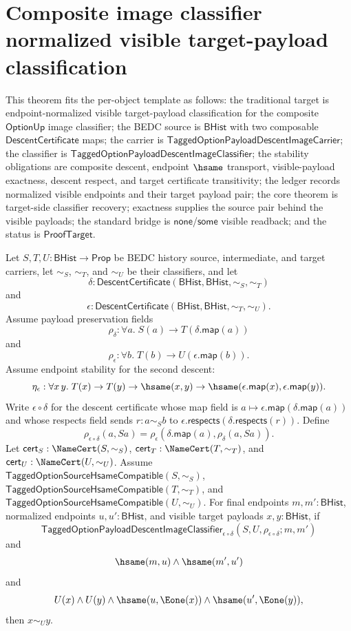 \section{Composite image classifier normalized visible target-payload classification}
\label{sec:option-composite-image-classifier-normalized-visible-target-classification}

\begin{theorem}
\label{thm:tagged-option-composite-image-classifier-normalized-visible-target-payload-classification}
This theorem fits the per-object template as follows: the traditional target is
endpoint-normalized visible target-payload classification for the composite
$\mathsf{OptionUp}$ image classifier; the BEDC source is $\mathsf{BHist}$ with
two composable $\mathsf{DescentCertificate}$ maps; the carrier is
$\mathsf{TaggedOptionPayloadDescentImageCarrier}$; the classifier is
$\mathsf{TaggedOptionPayloadDescentImageClassifier}$; the stability obligations
are composite descent, endpoint $\hsame$ transport, visible-payload exactness,
descent respect, and target certificate transitivity; the ledger records
normalized visible endpoints and their target payload pair; the core theorem is
target-side classifier recovery; exactness supplies the source pair behind the
visible payloads; the standard bridge is $\mathsf{none}$/$\mathsf{some}$
visible readback; and the status is $\mathsf{ProofTarget}$.

Let $S,T,U:\mathsf{BHist}\to\mathsf{Prop}$ be BEDC history source,
intermediate, and target carriers, let $\sim_S$, $\sim_T$, and $\sim_U$ be their
classifiers, and let
$$
\delta:\mathsf{DescentCertificate}(\mathsf{BHist},\mathsf{BHist},\sim_S,\sim_T)
$$
and
$$
\epsilon:\mathsf{DescentCertificate}(\mathsf{BHist},\mathsf{BHist},\sim_T,\sim_U).
$$
Assume payload preservation fields
$$
\rho_{\delta}:\forall a.\;S(a)\to T(\delta.\mathsf{map}(a))
$$
and
$$
\rho_{\epsilon}:\forall b.\;T(b)\to U(\epsilon.\mathsf{map}(b)).
$$
Assume endpoint stability for the second descent:
$$
\eta_{\epsilon}:\forall x\,y.\;
T(x)\to T(y)\to \hsame(x,y)\to
\hsame(\epsilon.\mathsf{map}(x),\epsilon.\mathsf{map}(y)).
$$
Write $\epsilon\circ\delta$ for the descent certificate whose map field is
$a\mapsto\epsilon.\mathsf{map}(\delta.\mathsf{map}(a))$ and whose respects field
sends $r:a\sim_S b$ to
$\epsilon.\mathsf{respects}(\delta.\mathsf{respects}(r))$. Define
$$
\rho_{\epsilon\circ\delta}(a,Sa)=
\rho_{\epsilon}(\delta.\mathsf{map}(a),\rho_{\delta}(a,Sa)).
$$
Let $\mathsf{cert}_S:\NameCert(S,\sim_S)$,
$\mathsf{cert}_T:\NameCert(T,\sim_T)$, and
$\mathsf{cert}_U:\NameCert(U,\sim_U)$. Assume
$\mathsf{TaggedOptionSourceHsameCompatible}(S,\sim_S)$,
$\mathsf{TaggedOptionSourceHsameCompatible}(T,\sim_T)$, and
$\mathsf{TaggedOptionSourceHsameCompatible}(U,\sim_U)$. For final endpoints
$m,m':\mathsf{BHist}$, normalized endpoints $u,u':\mathsf{BHist}$, and visible
target payloads $x,y:\mathsf{BHist}$, if
$$
\mathsf{TaggedOptionPayloadDescentImageClassifier}_{\epsilon\circ\delta}
(S,U,\rho_{\epsilon\circ\delta};m,m')
$$
and
$$
\hsame(m,u)\land \hsame(m',u')
$$
and
$$
U(x)\land U(y)\land
\hsame(u,\Eone(x))\land \hsame(u',\Eone(y)),
$$
then $x\sim_U y$.
\end{theorem}
